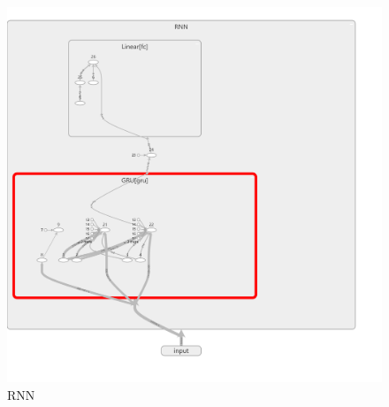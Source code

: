 \documentclass[a4paper]{article}
\begin{document}
    \begin{figure}[H]
        \centering
        \includegraphics[width=\linewidth]{assets/rnn.png}
        \caption{RNN}
    \end{figure}
\end{document}
